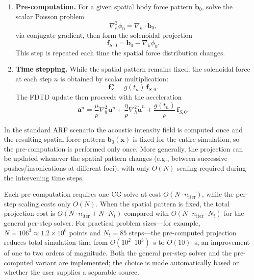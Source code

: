 \documentclass{iopjournal}
\begin{document}
\begin{enumerate}[leftmargin=1.5em]
\item \textbf{Pre-computation.} For a given spatial body force pattern
$\bm{b}_0$, solve the scalar Poisson problem
\begin{equation}
\nabla_h^2 \phi_0 = \nabla_h \cdot \bm{b}_0,
\end{equation}
via conjugate gradient, then form the solenoidal projection
\begin{equation}
\bm{f}_{S,0} = \bm{b}_0 - \nabla_h \phi_0.
\end{equation}
This step is repeated each time the spatial force distribution changes.

\item \textbf{Time stepping.} While the spatial pattern remains fixed, the
solenoidal force at each step $n$ is obtained by scalar multiplication:
\begin{equation}
\bm{f}_S^{\,n} = g(t_n)\,\bm{f}_{S,0}.
\end{equation}
The FDTD update then proceeds with the acceleration
\begin{equation}
\bm{a}^{n}
=
\frac{\mu}{\rho}\nabla_h^2 \bm{u}^{n}
+
\frac{\eta}{\rho}\nabla_h^2 \dot{\bm{u}}^{n}
+
\frac{g(t_n)}{\rho}\,\bm{f}_{S,0}.
\end{equation}
\end{enumerate}

In the standard ARF scenario the acoustic intensity field is computed once and
the resulting spatial force pattern $\bm{b}_0(\bm{x})$ is fixed for the entire
simulation, so the pre-computation is performed only once. More generally, the
projection can be updated whenever the spatial pattern changes (e.g., between
successive pushes/insonications at different foci), with only $O(N)$ scaling required during
the intervening time steps.

Each pre-computation requires one CG solve at cost
$O(N \cdot n_{\mathrm{iter}})$, while the per-step scaling costs only $O(N)$.
When the spatial pattern is fixed, the total projection cost is
$O(N \cdot n_{\mathrm{iter}} + N \cdot N_t)$ compared with
$O(N \cdot n_{\mathrm{iter}} \cdot N_t)$ for the general per-step solver.
For practical problem sizes---for example, $N = 106^3 \approx 1.2 \times 10^6$
points and $N_t = 85$ steps---the pre-computed projection reduces total
simulation time from $O(10^2\text{--}10^3)$~s to $O(10)$~s, an improvement of
one to two orders of magnitude. Both the general per-step solver and the
pre-computed variant are implemented; the choice is made automatically based on
whether the user supplies a separable source.
\end{document}
